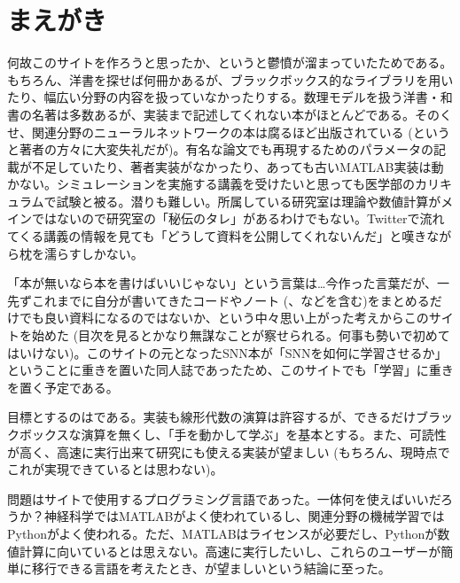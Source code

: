 \documentclass[letterpaper,10pt,english]{sphinxmanual}
\begin{document}
\section{まえがき}
\label{\detokenize{preface:id1}}\label{\detokenize{preface::doc}}
何故このサイトを作ろうと思ったか、というと鬱憤が溜まっていたためである。 もちろん、洋書を探せば何冊かあるが、ブラックボックス的なライブラリを用いたり、幅広い分野の内容を扱っていなかったりする。数理モデルを扱う洋書・和書の名著は多数あるが、実装まで記述してくれない本がほとんどである。そのくせ、関連分野のニューラルネットワークの本は腐るほど出版されている (というと著者の方々に大変失礼だが)。有名な論文でも再現するためのパラメータの記載が不足していたり、著者実装がなかったり、あっても古いMATLAB実装は動かない。シミュレーションを実施する講義を受けたいと思っても医学部のカリキュラムで試験と被る。潜りも難しい。所属している研究室は理論や数値計算がメインではないので研究室の「秘伝のタレ」があるわけでもない。Twitterで流れてくる講義の情報を見ても「どうして資料を公開してくれないんだ」と嘆きながら枕を濡らすしかない。

「本が無いなら本を書けばいいじゃない」という言葉は…今作った言葉だが、一先ずこれまでに自分が書いてきたコードやノート (、などを含む)をまとめるだけでも良い資料になるのではないか、という中々思い上がった考えからこのサイトを始めた (目次を見るとかなり無謀なことが察せられる。何事も勢いで初めてはいけない)。このサイトの元となったSNN本が「SNNを如何に学習させるか」ということに重きを置いた同人誌であったため、このサイトでも「学習」に重きを置く予定である。

目標とするのはである。実装も線形代数の演算は許容するが、できるだけブラックボックスな演算を無くし、「手を動かして学ぶ」を基本とする。また、可読性が高く、高速に実行出来て研究にも使える実装が望ましい (もちろん、現時点でこれが実現できているとは思わない)。

問題はサイトで使用するプログラミング言語であった。一体何を使えばいいだろうか？神経科学ではMATLABがよく使われているし、関連分野の機械学習ではPythonがよく使われる。ただ、MATLABはライセンスが必要だし、Pythonが数値計算に向いているとは思えない。高速に実行したいし、これらのユーザーが簡単に移行できる言語を考えたとき、が望ましいという結論に至った。
\end{document}
